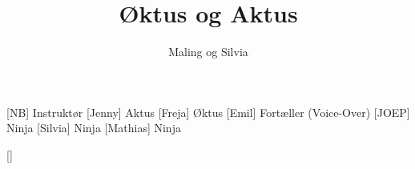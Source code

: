 \documentclass[a4paper,11pt]{article}
\title{Øktus og Aktus}
\author{Maling og Silvia}
\begin{document}
	\maketitle
	
\begin{roles}
[NB] Instruktør
[Jenny] Aktus
[Freja] Øktus
[Emil] Fortæller (Voice-Over)
[JOEP] Ninja
[Silvia] Ninja
[Mathias] Ninja
\end{roles}
	
\begin{props}
[]
\end{props}
	
	
\end{document}
